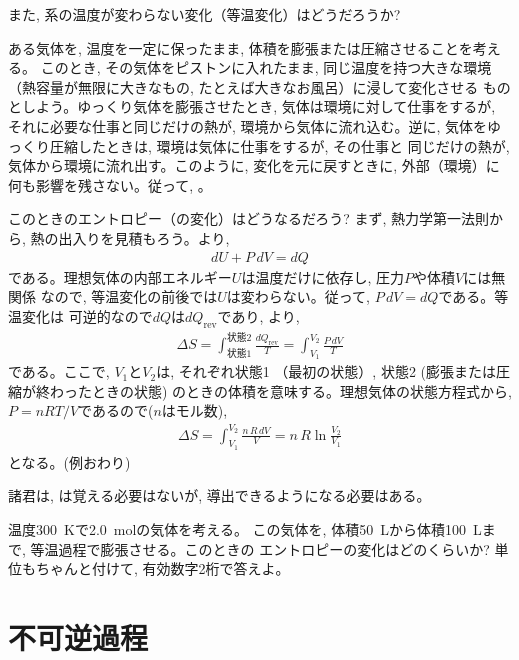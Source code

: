また, 系の温度が変わらない変化（等温変化）はどうだろうか?

\begin{exmpl}\label{exmpl:gas_expand_rev} 
ある気体を, 温度を一定に保ったまま, 体積を膨張または圧縮させることを考える。
このとき, その気体をピストンに入れたまま, 同じ温度を持つ大きな環境
（熱容量が無限に大きなもの, たとえば大きなお風呂）に浸して変化させる
ものとしよう。ゆっくり気体を膨張させたとき, 気体は環境に対して仕事をするが, 
それに必要な仕事と同じだけの熱が, 環境から気体に流れ込む。逆に, 
気体をゆっくり圧縮したときは, 環境は気体に仕事をするが, その仕事と
同じだけの熱が, 気体から環境に流れ出す。このように, 変化を元に戻すときに, 
外部（環境）に何も影響を残さない。従って, 。

このときのエントロピー（の変化）はどうなるだろう? 
まず, 熱力学第一法則から, 熱の出入りを見積もろう。より, 
\begin{eqnarray}
dU+P\,dV=dQ
\end{eqnarray}
である。理想気体の内部エネルギー$U$は温度だけに依存し, 圧力$P$や体積$V$には無関係
なので, 等温変化の前後では$U$は変わらない。従って, $P\,dV=dQ$である。等温変化は
可逆的なので$dQ$は$dQ_{\text{rev}}$であり, より, 
\begin{eqnarray}
\Delta S=\int_{\text{状態1}}^{\text{状態2}} \frac{dQ_{\text{rev}}}{T}=\int_{V_1}^{V_2}\frac{P\,dV}{T}
\end{eqnarray}
である。ここで, $V_1$と$V_2$は, それぞれ状態1 （最初の状態）, 状態2 (膨張または圧縮が終わったときの状態)
のときの体積を意味する。理想気体の状態方程式から, $P=nRT/V$であるので($n$はモル数), 
\begin{eqnarray}
\Delta S=\int_{V_1}^{V_2} \frac{n\,R\,dV}{V}=n\,R\ln\frac{V_2}{V_1}\label{eq:entropy_isothermal}
\end{eqnarray}
となる。(例おわり)\end{exmpl}

諸君は, は覚える必要はないが, 導出できるようになる必要はある。

\begin{q}\label{q:entropy_isothermal2} 温度300~Kで2.0~molの気体を考える。
この気体を, 体積50~Lから体積100~Lまで, 等温過程で膨張させる。このときの
エントロピーの変化はどのくらいか? 単位もちゃんと付けて, 有効数字2桁で答えよ。
\end{q}\mv


\section{不可逆過程}

